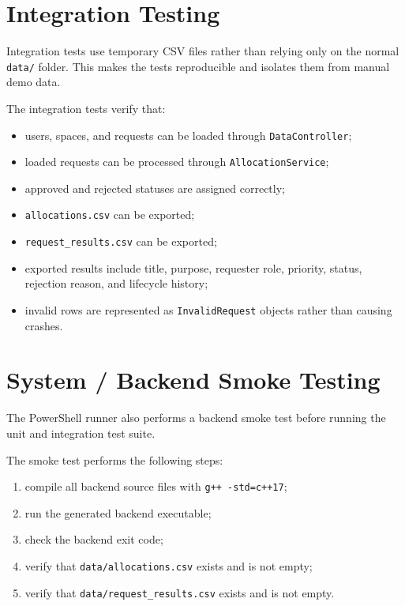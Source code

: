 \documentclass[12pt,a4paper]{article}
\begin{document}
\section{Integration Testing}

Integration tests use temporary CSV files rather than relying only on the normal \texttt{data/} folder. This makes the tests reproducible and isolates them from manual demo data.

The integration tests verify that:

\begin{itemize}
    \item users, spaces, and requests can be loaded through \texttt{DataController};
    \item loaded requests can be processed through \texttt{AllocationService};
    \item approved and rejected statuses are assigned correctly;
    \item \texttt{allocations.csv} can be exported;
    \item \texttt{request\_results.csv} can be exported;
    \item exported results include title, purpose, requester role, priority, status, rejection reason, and lifecycle history;
    \item invalid rows are represented as \texttt{InvalidRequest} objects rather than causing crashes.
\end{itemize}

\section{System / Backend Smoke Testing}

The PowerShell runner also performs a backend smoke test before running the unit and integration test suite.

The smoke test performs the following steps:

\begin{enumerate}
    \item compile all backend source files with \texttt{g++ -std=c++17};
    \item run the generated backend executable;
    \item check the backend exit code;
    \item verify that \texttt{data/allocations.csv} exists and is not empty;
    \item verify that \texttt{data/request\_results.csv} exists and is not empty.
\end{enumerate}
\end{document}
